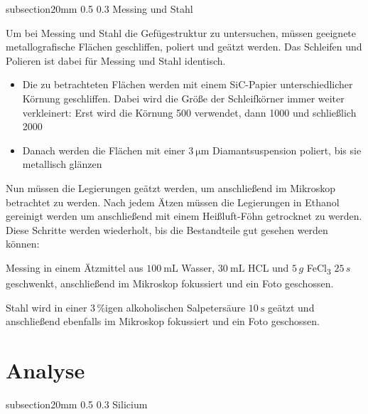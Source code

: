 \documentclass[german, %
parskip=full, %
bibliography=totoc, %
]{scrartcl}
\makeatletter
\renewcommand\subsection{\@startsection 
   {subsection}{2}{0mm}%
   {0.5\baselineskip}%
   {0.3\baselineskip}%
   {\bfseries\sffamily\large}%
   }
\makeatother
\begin{document}
\subsection{Messing und Stahl}

Um bei Messing und Stahl die Gefügestruktur zu untersuchen, müssen geeignete metallografische Flächen geschliffen, poliert und geätzt werden. Das Schleifen und Polieren ist dabei für Messing und Stahl identisch. 

\begin{itemize}
\item[1.] Die zu betrachteten Flächen werden mit einem SiC-Papier unterschiedlicher Körnung geschliffen. Dabei wird die Größe der Schleifkörner immer weiter verkleinert: Erst wird die Körnung 500 verwendet, dann 1000 und schließlich 2000
\item[2.] Danach werden die Flächen mit einer \(\SI{3}{\micro\meter}\) Diamantsuspension poliert, bis sie metallisch glänzen
\end{itemize}

Nun müssen die Legierungen geätzt werden, um anschließend im Mikroskop betrachtet zu werden. Nach jedem Ätzen müssen die Legierungen in Ethanol gereinigt werden um anschließend mit einem Heißluft-Föhn getrocknet zu werden. Diese Schritte werden wiederholt, bis die Bestandteile gut gesehen werden können:

Messing in einem Ätzmittel aus \(\SI{100}{\milli\liter}\) Wasser, \(\SI{30}{\milli\liter}\) HCL und $5\,g$ FeCl\textsubscript{3} $25\,s$ geschwenkt, anschließend im Mikroskop fokussiert und ein Foto geschossen.

Stahl wird in einer $3\,\%$igen alkoholischen Salpetersäure \(\SI{10}{\second}\) geätzt und anschließend ebenfalls im Mikroskop fokussiert und ein Foto geschossen.

\section{Analyse}

\subsection{Silicium}
\end{document}
